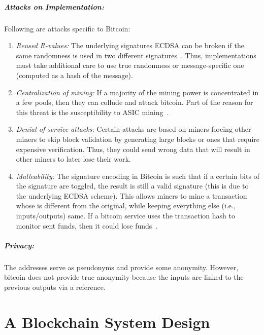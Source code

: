 \documentclass[]{report}   %
\begin{document}
\paragraph{Attacks on Implementation:} Following are attacks specific to Bitcoin:
\begin{enumerate}
	\item {\em Reused R-values:} The underlying signatures ECDSA can be broken if the same randomness is used in two different signatures~\cite{reusedRvalues}. Thus, implementations must take additional care to use true randomness or message-specific one (computed as a hash of the message).
	\item {\em Centralization of mining:} If a majority of the mining power is concentrated in a few pools, then they can collude and attack bitcoin. Part of the reason for this threat is the susceptibility to ASIC mining~\cite{asic}.
	\item {\em Denial of service attacks:} Certain attacks are based on miners forcing other miners to skip block validation by generating large blocks or ones that require expensive verification. Thus, they could send wrong data that will result in other miners to later lose their work.
	\item {\em Malleability:} The signature encoding in Bitcoin is such that if a certain bits of the signature are toggled, the result is still a valid signature (this is due to the underlying ECDSA scheme). This allows miners to mine a transaction whose is different from the original, while keeping everything else (i.e., inputs/outputs) same. If a bitcoin service uses the transaction hash to monitor sent funds, then it could lose funds~\cite{gox}.
\end{enumerate}

\paragraph{Privacy:} The addresses serve as pseudonyms and provide some anonymity. However, bitcoin does not provide true anonymity because the inputs are linked to the previous outputs via a reference.


\chapter{A Blockchain System Design}             %
\end{document}
